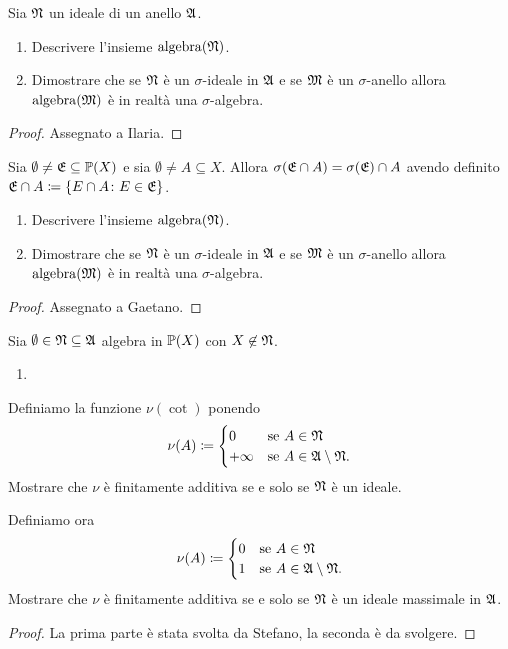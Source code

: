 \documentclass[../EserciziIstituzioniAnalisi.tex]{subfiles}
\begin{document}
\begin{exercise}
  
\end{exercise}

\begin{exercise}[13/10/2016]
Sia $\mathfrak N$ un ideale di un anello $\mathfrak A$.
\begin{enumerate}
\item Descrivere l'insieme $\operatorname{algebra}(\mathfrak N)$.
\item Dimostrare che se $\mathfrak N$ è un $\sigma$-ideale in $\mathfrak A$ e se $\mathfrak M$ è un $\sigma$-anello allora $\operatorname{algebra}(\mathfrak M)$ è in realtà una $\sigma$-algebra.
\end{enumerate}
\end{exercise}
\begin{proof}
  Assegnato a Ilaria.
\end{proof}

\begin{exercise}[2016-10-13]
Sia $\emptyset \neq \mathfrak E \subseteq \mathbb P(X)$ e sia $\emptyset \neq A \subseteq X$.
Allora $\sigma(\mathfrak E \cap A) = \sigma(\mathfrak E) \cap A$ avendo definito $\mathfrak E \cap A \coloneqq \left\lbrace E \cap A \colon E \in \mathfrak E\right\rbrace$.
\begin{enumerate}
\item Descrivere l'insieme $\operatorname{algebra}(\mathfrak N)$.
\item Dimostrare che se $\mathfrak N$ è un $\sigma$-ideale in $\mathfrak A$ e se $\mathfrak M$ è un $\sigma$-anello allora $\operatorname{algebra}(\mathfrak M)$ è in realtà una $\sigma$-algebra.
\end{enumerate}
\end{exercise}
\begin{proof}
Assegnato a Gaetano.
\end{proof}

\begin{exercise}[13/10/2016]
  Sia $\emptyset \in \mathfrak N \subseteq \mathfrak A$ algebra in $\mathbb P(X)$ con $X \not\in \mathfrak N$.
  \begin{enumerate}
  \item 
  \end{enumerate}
  Definiamo la funzione $\nu(\cot)$ ponendo 
  \begin{equation*}
    \nu(A) \coloneqq
    \begin{cases}
      0 & \text{se $A \in \mathfrak N$}\\
      +\infty & \text{se $A \in \mathfrak A\setminus \mathfrak N$}.
    \end{cases}
  \end{equation*}
  Mostrare che $\nu$ è finitamente additiva se e solo se $\mathfrak N$ è un ideale. 
\item Definiamo ora
  \begin{equation*}
    \nu(A) \coloneqq
    \begin{cases}
      0 & \text{se $A \in \mathfrak N$}\\
      1 & \text{se $A \in \mathfrak A\setminus \mathfrak N$}.
    \end{cases}
  \end{equation*}
  Mostrare che $\nu$ è finitamente additiva se e solo se $\mathfrak N$ è un ideale massimale in $\mathfrak A$.
\end{exercise}
\begin{proof}
  La prima parte è stata svolta da Stefano, la seconda è da svolgere.
\end{proof}
\end{document}
